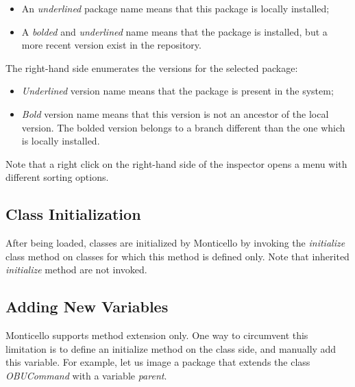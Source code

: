 \documentclass[a4paper,10pt,twoside]{book}
\begin{document}
\begin{itemize}
\item An \emph{underlined} package name means that this package is locally installed;
\item A \emph{bolded} and \emph{underlined} name means that the package is installed, but a more recent version exist in the repository.
\end{itemize}

The right-hand side enumerates the versions for the selected package:

\begin{itemize}
\item \emph{Underlined} version name means that the package is present in the system;
\item \emph{Bold} version name means that this version is not an ancestor of the local version. The bolded version belongs to a branch different than the one which is locally installed.
\end{itemize}

Note that a right click on the right-hand side of the inspector opens a menu with different sorting options.


\subsection{Class Initialization}

After being loaded, classes are initialized by Monticello by invoking the \emph{initialize} class method on classes for which this method is defined only. Note that inherited \emph{initialize} method are not invoked. 

\subsection{Adding New Variables}

Monticello supports method extension only. One way to circumvent this limitation is to define an initialize method on the class side, and manually add this variable. For example, let us image a package that extends the class \emph{OBUCommand} with a variable \emph{parent}.
\end{document}
